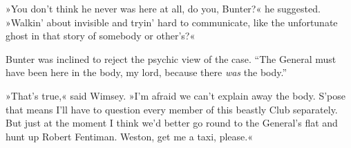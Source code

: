 »You don't think he never was here at all, do you, Bunter?« he suggested. »Walkin' about invisible and tryin' hard to communicate, like the unfortunate ghost in that story of somebody or other's?«

Bunter was inclined to reject the psychic view of the case. \enquote{The General must have been here in the body, my lord, because there \textit{was} the body.}

»That's true,« said Wimsey. »I'm afraid we can't explain away the body. S'pose that means I'll have to question every member of this beastly Club separately. But just at the moment I think we'd better go round to the General's flat and hunt up Robert Fentiman. Weston, get me a taxi, please.«